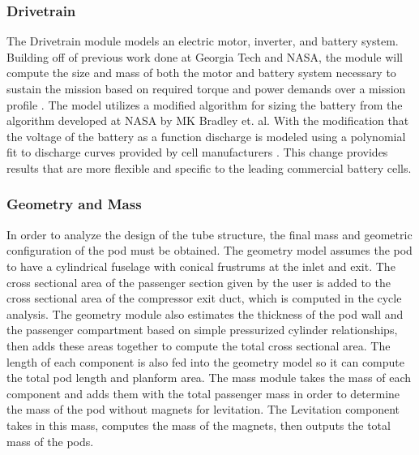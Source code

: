 \subsubsection{Drivetrain}
	The Drivetrain module models an electric motor, inverter, and battery system.
	Building off of previous work done at Georgia Tech and NASA, the module
	will compute the size and mass of both the motor and battery system
	necessary to sustain the mission based on required torque and power demands
	over a mission profile \cite{GeorgiaTechMotor, NASASugar}. The model
	utilizes a modified algorithm for sizing the battery from the algorithm
	developed at NASA by MK Bradley et. al. With the modification that the
	voltage of the battery as a function discharge is modeled using a
	polynomial fit to discharge curves provided by cell manufacturers \cite{NASASugar}.
	This change provides results that are more flexible and specific to the
	leading commercial battery cells.
\subsubsection{Geometry and Mass}
	In order to analyze the design of the tube structure, the final mass and
	geometric configuration of the pod must be obtained. The geometry model
	assumes the pod to have a cylindrical fuselage with conical frustrums at
	the inlet and exit. The cross sectional area of the passenger section
	given by the user is added to the cross sectional area of the compressor
	exit duct, which is computed in the cycle analysis. The geometry module
	also estimates the thickness of the pod wall and the passenger compartment
	based on simple pressurized cylinder relationships, then adds these areas
	together to compute the total cross sectional area. The length of each
	component is also fed into the geometry model so it can compute the total
	pod length and planform area. The mass module takes the mass of each
	component and adds them with the total passenger mass in order to determine
	the mass of the pod without magnets for levitation. The Levitation component
	takes in this mass, computes the mass of the magnets, then outputs the total mass of the pods.

